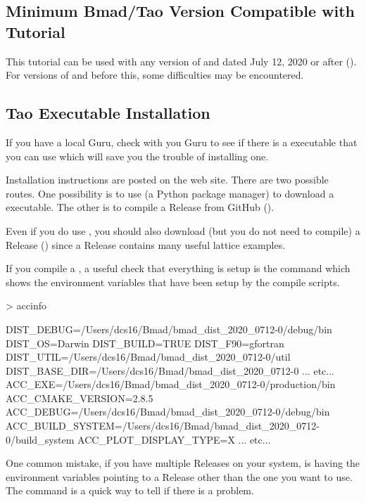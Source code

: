 \documentclass{hitec}     %
\begin{document}
\subsection{Minimum Bmad/Tao Version Compatible with Tutorial}

This tutorial can be used with any version of \bmad and \tao dated July 12, 2020 or after
(). For versions of \bmad and \tao before this, some difficulties may be
encountered.

\subsection{Tao Executable Installation}
\label{s:install}

If you have a local \bmad Guru, check with you Guru to see if there is a \tao executable that you
can use which will save you the trouble of installing one.

Installation instructions are posted on the \bmad web site.
There are two possible routes. One possibility is to use  (a Python
package manager) to download a \tao executable. The other is to compile a \bmad Release from GitHub
().

Even if you do use , you should also download (but you do not need to compile) a
Release () since a Release contains many useful lattice examples.

If you compile a , a useful check that everything is setup
is the  command which shows the environment variables that have been setup by the
compile scripts.
\begin{code}
> accinfo

DIST_DEBUG=/Users/dcs16/Bmad/bmad_dist_2020_0712-0/debug/bin
DIST_OS=Darwin
DIST_BUILD=TRUE
DIST_F90=gfortran
DIST_UTIL=/Users/dcs16/Bmad/bmad_dist_2020_0712-0/util
DIST_BASE_DIR=/Users/dcs16/Bmad/bmad_dist_2020_0712-0
... etc...
ACC_EXE=/Users/dcs16/Bmad/bmad_dist_2020_0712-0/production/bin
ACC_CMAKE_VERSION=2.8.5
ACC_DEBUG=/Users/dcs16/Bmad/bmad_dist_2020_0712-0/debug/bin
ACC_BUILD_SYSTEM=/Users/dcs16/Bmad/bmad_dist_2020_0712-0/build_system
ACC_PLOT_DISPLAY_TYPE=X
... etc...
\end{code}
One common mistake, if you have multiple Releases on your system, is having the environment
variables pointing to a Release other than the one you want to use. The  command
is a quick way to tell if there is a problem.
\end{document}
